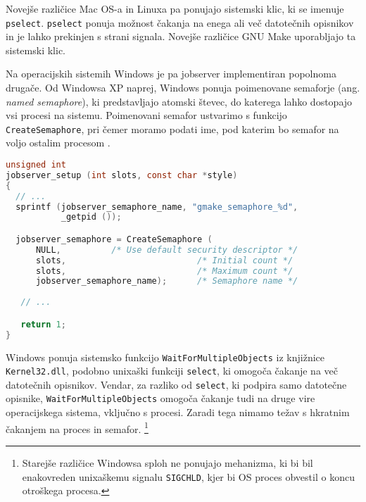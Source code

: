 \documentclass[notitlepage]{report}
\begin{document}
Novejše različice Mac OS-a in Linuxa pa ponujajo sistemski klic, ki se
imenuje \verb|pselect|. \verb|pselect| ponuja možnost čakanja na enega
ali več datotečnih opisnikov in je lahko prekinjen s strani
signala. Novejše različice GNU Make uporabljajo ta sistemski klic.

Na operacijskih sistemih Windows je pa jobserver implementiran
popolnoma drugače. Od Windowsa XP naprej, Windows ponuja poimenovane
semaforje (ang. \textit{named semaphore}), ki predstavljajo atomski
števec, do katerega lahko dostopajo vsi procesi na
sistemu. Poimenovani semafor ustvarimo s funkcijo
\verb|CreateSemaphore|, pri čemer moramo podati ime, pod katerim bo
semafor na voljo ostalim procesom \cite{ms-semaphore}.

\begin{lstlisting}[language=C, basicstyle=\sffamily]
unsigned int
jobserver_setup (int slots, const char *style)
{
  // ...
  sprintf (jobserver_semaphore_name, "gmake_semaphore_%d",
           _getpid ());

  jobserver_semaphore = CreateSemaphore (
      NULL,          /* Use default security descriptor */
      slots,                          /* Initial count */
      slots,                          /* Maximum count */
      jobserver_semaphore_name);      /* Semaphore name */
      
   // ...

   return 1;   
}      
\end{lstlisting}

Windows ponuja sistemsko funkcijo \verb|WaitForMultipleObjects| iz
knjižnice \verb|Kernel32.dll|, podobno unixaški funkciji
\verb|select|, ki omogoča čakanje na več datotečnih opisnikov. Vendar,
za razliko od \verb|select|, ki podpira samo datotečne opisnike,
\verb|WaitForMultipleObjects| omogoča čakanje tudi na druge vire
operacijskega sistema, vključno s procesi. Zaradi tega nimamo težav s
hkratnim čakanjem na proces in semafor. \footnote{Starejše različice
  Windowsa sploh ne ponujajo mehanizma, ki bi bil enakovreden
  unixaškemu signalu \verb|SIGCHLD|, kjer bi OS proces obvestil o
  koncu otroškega procesa.}


\end{document}
